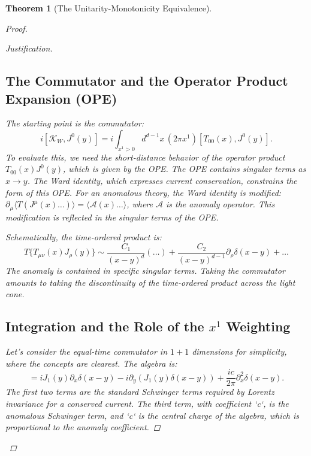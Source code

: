 \documentclass[11pt, letterpaper]{report}
\theoremstyle{plain} %
\newtheorem{theorem}{Theorem}[chapter]
\theoremstyle{definition} %
\theoremstyle{remark} %
\newcommand{\ModularK}{\mathcal{K}}
\begin{document}
\begin{theorem}[The Unitarity-Monotonicity Equivalence]
\begin{proof}
\begin{proof}[Justification]
\subsection{The Commutator and the Operator Product Expansion (OPE)}
The starting point is the commutator:
\begin{equation}
    i[\ModularK_W, J^0(y)] = i \int_{x^1>0} d^{d-1}x \, (2\pi x^1) [T_{00}(x), J^0(y)].
\end{equation}
To evaluate this, we need the short-distance behavior of the operator product $T_{00}(x) J^0(y)$, which is given by the OPE. The OPE contains singular terms as $x \to y$. The Ward identity, which expresses current conservation, constrains the form of this OPE. For an anomalous theory, the Ward identity is modified: $\partial_\mu \langle T(J^\mu(x) \dots) \rangle = \langle \mathcal{A}(x) \dots \rangle$, where $\mathcal{A}$ is the anomaly operator. This modification is reflected in the singular terms of the OPE.

Schematically, the time-ordered product is:
\begin{equation}
    T\{T_{\mu\nu}(x) J_\rho(y)\} \sim \frac{C_1}{(x-y)^d} (\dots) + \frac{C_2}{(x-y)^{d-1}} \partial_\rho \delta(x-y) + \dots
\end{equation}
The anomaly is contained in specific singular terms. Taking the commutator amounts to taking the discontinuity of the time-ordered product across the light cone.

\subsection{Integration and the Role of the \texorpdfstring{$x^1$}{x1} Weighting}
Let's consider the equal-time commutator in $1+1$ dimensions for simplicity, where the concepts are clearest. The algebra is:
\begin{equation}
    [T_{00}(x), J_0(y)] = i J_1(y) \partial_x \delta(x-y) - i \partial_y (J_1(y)\delta(x-y)) + \frac{ic}{2\pi} \partial_x^2 \delta(x-y).
\end{equation}
The first two terms are the standard Schwinger terms required by Lorentz invariance for a conserved current. The third term, with coefficient `c`, is the anomalous Schwinger term, and `c` is the central charge of the algebra, which is proportional to the anomaly coefficient.


\end{proof}
\end{proof}
\end{theorem}
\end{document}
